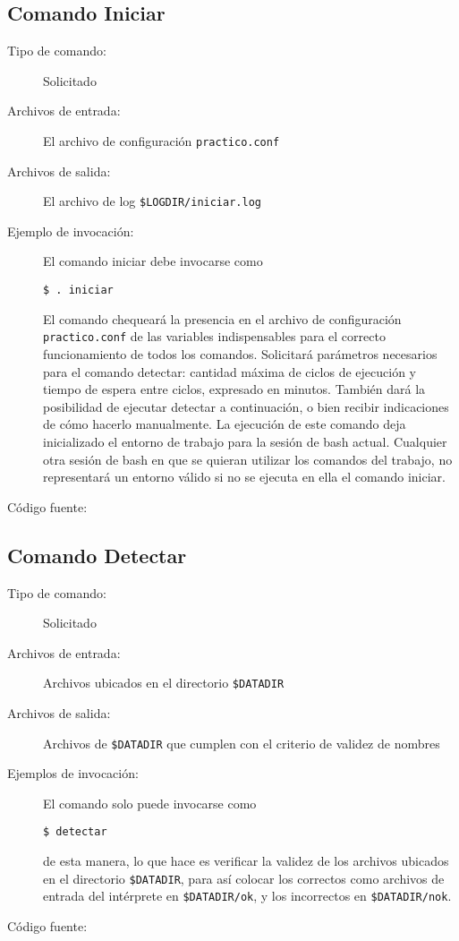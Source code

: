 \documentclass[12pt]{article}
\begin{document}
\subsection{Comando Iniciar}
\begin{description}
	\item [Tipo de comando:] Solicitado
	
	\item [Archivos de entrada:] El archivo de configuración \verb|practico.conf|
	
	\item [Archivos de salida:] El archivo de log \verb|$LOGDIR/iniciar.log|
	
	\item [Ejemplo de invocación:] El comando iniciar debe invocarse como
	\begin{verbatim}$ . iniciar\end{verbatim}
	El comando chequeará la presencia en el archivo de configuración \verb|practico.conf| de las variables indispensables para el correcto funcionamiento de todos los comandos. Solicitará parámetros necesarios para el comando detectar: cantidad máxima de ciclos de ejecución y tiempo de espera entre ciclos, expresado en minutos. También dará la posibilidad de ejecutar detectar a continuación, o bien recibir indicaciones de cómo hacerlo manualmente. La ejecución de este comando deja inicializado el entorno de trabajo para la sesión de bash actual. Cualquier otra sesión de bash en que se quieran utilizar los comandos del trabajo, no representará un entorno válido si no se ejecuta en ella el comando iniciar.
	
	\item [Código fuente:]
\end{description}
{\footnotesize

}

\subsection{Comando Detectar}
\begin{description}
	\item [Tipo de comando:] Solicitado
	
	\item [Archivos de entrada:] Archivos ubicados en el directorio \verb|$DATADIR|
	
	\item [Archivos de salida:] Archivos de \verb|$DATADIR| que cumplen con el criterio de validez de nombres
	
	\item [Ejemplos de invocación:]	El comando solo puede invocarse como
	\begin{verbatim}$ detectar\end{verbatim}
	de esta manera, lo que hace es verificar la validez de los archivos ubicados en el directorio \verb|$DATADIR|, para así colocar los correctos como archivos de entrada del intérprete en \verb|$DATADIR/ok|, y los incorrectos en \verb|$DATADIR/nok|.
	
	\item [Código fuente:]
\end{description}
{\footnotesize

}
\end{document}
